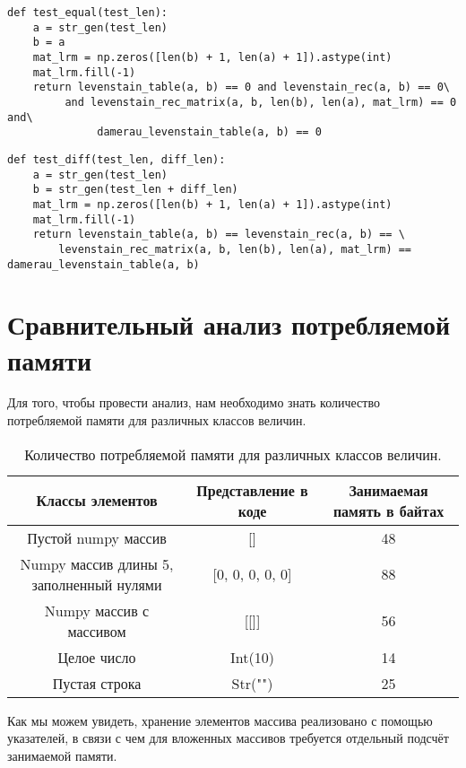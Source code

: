 \begin{lstlisting}[label=some-code-9,caption=Реализация тестирования строк равной ненулевой длины.]
def test_equal(test_len):
    a = str_gen(test_len)
    b = a
    mat_lrm = np.zeros([len(b) + 1, len(a) + 1]).astype(int)
    mat_lrm.fill(-1)
    return levenstain_table(a, b) == 0 and levenstain_rec(a, b) == 0\
         and levenstain_rec_matrix(a, b, len(b), len(a), mat_lrm) == 0 and\
              damerau_levenstain_table(a, b) == 0
\end{lstlisting}

\begin{lstlisting}[label=some-code-10,caption=Реализация тестирования строк разной ненулевой длины.]
def test_diff(test_len, diff_len):
    a = str_gen(test_len)
    b = str_gen(test_len + diff_len)
    mat_lrm = np.zeros([len(b) + 1, len(a) + 1]).astype(int)
    mat_lrm.fill(-1)
    return levenstain_table(a, b) == levenstain_rec(a, b) == \
        levenstain_rec_matrix(a, b, len(b), len(a), mat_lrm) == damerau_levenstain_table(a, b)
\end{lstlisting}

\section{Сравнительный анализ потребляемой памяти}
Для того, чтобы провести анализ, нам необходимо знать количество потребляемой памяти для различных классов величин.

\begin{table}[h!]
  \begin{center}
    \caption{Количество потребляемой памяти для различных классов величин.}
    \label{tab:table1}
    \begin{tabular}{c|c|c}
      \textbf{Классы элементов} & \textbf{Представление в коде} & \textbf{Занимаемая память в байтах}\\
      \hline
	Пустой numpy массив & [] & 48\\
	Numpy массив длины 5, заполненный нулями & [0, 0, 0, 0, 0] & 88\\
	Numpy массив с массивом & [[]] & 56\\
	Целое число & Int(10) & 14\\
	Пустая строка & Str("") & 25
    \end{tabular}
  \end{center}
\end{table}

Как мы можем увидеть, хранение элементов массива реализовано с помощью указателей, в связи с чем для вложенных массивов требуется отдельный подсчёт занимаемой памяти.

